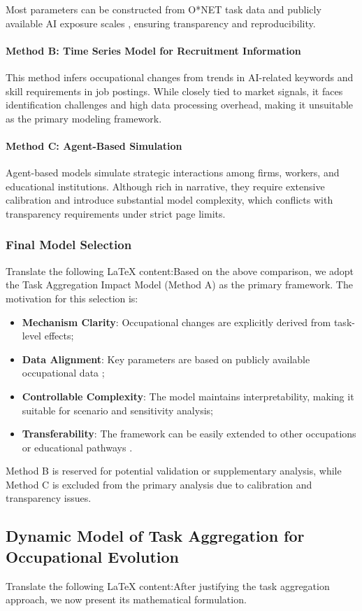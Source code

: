Most parameters can be constructed from O*NET task data \cite{onet2025database} and publicly available AI exposure scales \cite{freyosborne2017}, ensuring transparency and reproducibility.\paragraph{Method B: Time Series Model for Recruitment Information}This method infers occupational changes from trends in AI-related keywords and skill requirements in job postings.  
While closely tied to market signals, it faces identification challenges and high data processing overhead, making it unsuitable as the primary modeling framework.\paragraph{Method C: Agent-Based Simulation}Agent-based models simulate strategic interactions among firms, workers, and educational institutions.  
Although rich in narrative, they require extensive calibration and introduce substantial model complexity, which conflicts with transparency requirements under strict page limits.\subsubsection{Final Model Selection}Translate the following LaTeX content:Based on the above comparison, we adopt the Task Aggregation Impact Model (Method A) as the primary framework.  
The motivation for this selection is:  
\begin{itemize}  
    \item \textbf{Mechanism Clarity}: Occupational changes are explicitly derived from task-level effects;  
    \item \textbf{Data Alignment}: Key parameters are based on publicly available occupational data \cite{onet2025database,censuspseo2025};  
    \item \textbf{Controllable Complexity}: The model maintains interpretability, making it suitable for scenario and sensitivity analysis;  
    \item \textbf{Transferability}: The framework can be easily extended to other occupations or educational pathways \cite{ncescip2020soc2018}.  
\end{itemize}Method B is reserved for potential validation or supplementary analysis, while Method C is excluded from the primary analysis due to calibration and transparency issues.\subsection{Dynamic Model of Task Aggregation for Occupational Evolution}Translate the following LaTeX content:After justifying the task aggregation approach, we now present its mathematical formulation.
